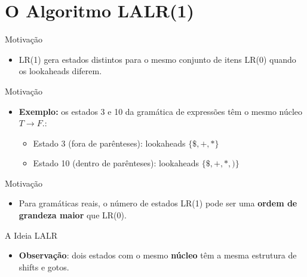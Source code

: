 \section{O Algoritmo LALR(1)}\label{o-algoritmo-lalr1}

\begin{frame}{Motivação}

    \begin{itemize}

        \item
        LR(1) gera estados distintos para o mesmo conjunto de itens LR(0)
        quando os lookaheads diferem.
    \end{itemize}
\end{frame}

\begin{frame}{Motivação}

    \begin{itemize}

        \item
        \textbf{Exemplo:} os estados 3 e 10 da gramática de expressões têm o
        mesmo núcleo \(T \to F .\):

        \begin{itemize}

            \item
            Estado 3 (fora de parênteses): lookaheads \(\{\$, +, *\}\)
            \item
            Estado 10 (dentro de parênteses): lookaheads \(\{\$, +, *, )\}\)
        \end{itemize}
    \end{itemize}
\end{frame}

\begin{frame}{Motivação}

    \begin{itemize}

        \item
        Para gramáticas reais, o número de estados LR(1) pode ser uma
        \textbf{ordem de grandeza maior} que LR(0).
    \end{itemize}
\end{frame}

\begin{frame}{A Ideia LALR}

    \begin{itemize}

        \item
        \textbf{Observação}: dois estados com o mesmo \textbf{núcleo} têm a
        mesma estrutura de shifts e gotos.
    \end{itemize}
\end{frame}

